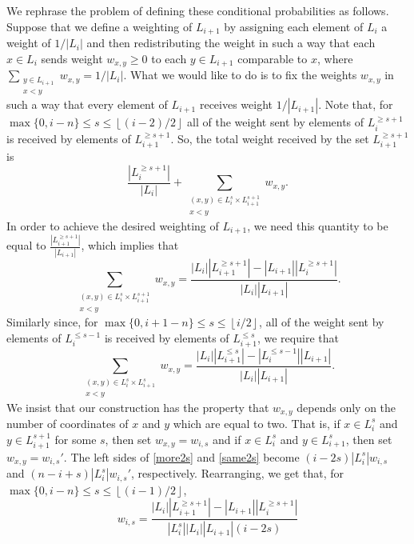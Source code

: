 \documentclass[11 pt]{article}
\theoremstyle{definition}
\theoremstyle{case}
\numberwithin{equation}{section}
\begin{document}
We rephrase the problem of defining these conditional probabilities as follows. Suppose that we define a weighting of $L_{i+1}$ by assigning each element of $L_i$ a weight of $1/|L_i|$ and then redistributing the weight in such a way that each $x\in L_i$ sends weight $w_{x,y}\geq0$ to each $y\in L_{i+1}$ comparable to $x$, where $\sum_{\substack{y\in L_{i+1}\\ x<y}}w_{x,y}=1/|L_i|$. What we would like to do is to fix the weights $w_{x,y}$ in such a way that every element of $L_{i+1}$ receives weight $1/|L_{i+1}|$. Note that, for $\max\{0,i-n\}\leq s\leq \left\lfloor (i-2)/2\right\rfloor$ all of the weight sent by elements of $L_i^{\geq s+1}$ is received by elements of $L_{i+1}^{\geq s+1}$. So, the total weight received by the set $L_{i+1}^{\geq s+1}$ is 
\[\frac{\left|L_i^{\geq s+1}\right|}{|L_i|} + \sum_{\substack{(x,y)\in L_i^{s}\times L_{i+1}^{s+1}\\ x<y}}w_{x,y}.\]
In order to achieve the desired weighting of $L_{i+1}$, we need this quantity to be equal to $\frac{\left|L_{i+1}^{\geq s+1}\right|}{|L_{i+1}|}$, which implies that
\begin{equation}\label{more2s}\sum_{\substack{(x,y)\in L_i^{s}\times L_{i+1}^{s+1}\\ x<y}}w_{x,y} = \frac{\left|L_i\right|\left|L_{i+1}^{\geq s+1}\right|-\left|L_{i+1}\right|\left|L_i^{\geq s+1}\right|}{\left|L_i\right|\left|L_{i+1}\right|}.\end{equation}
Similarly since, for $\max\{0,i+1-n\}\leq s\leq \left\lfloor i/2\right\rfloor$, all of the weight sent by elements of $L_i^{\leq s-1}$ is received by elements of $L_{i+1}^{\leq s}$, we require that
\begin{equation}\label{same2s}\sum_{\substack{(x,y)\in L_i^{s}\times L_{i+1}^{s}\\ x<y}}w_{x,y} = \frac{|L_i|\left|L_{i+1}^{\leq s}\right|-\left|L_i^{\leq s-1}\right||L_{i+1}|}{|L_i||L_{i+1}|}.\end{equation}
We insist that our construction has the property that $w_{x,y}$ depends only on the number of coordinates of $x$ and $y$ which are equal to two. That is, if $x\in L_i^s$ and $y\in L_{i+1}^{s+1}$ for some $s$, then set $w_{x,y}=w_{i,s}$ and if $x\in L_i^s$ and $y\in L_{i+1}^s$, then set $w_{x,y}=w_{i,s}'$. The left sides of  \eqref{more2s} and \eqref{same2s} become $(i-2s)|L_i^s|w_{i,s}$ and $(n-i+s)|L_i^s|w_{i,s}'$, respectively. Rearranging, we get that, for  $\max\{0,i-n\}\leq s\leq \left\lfloor (i-1)/2\right\rfloor$, 
\begin{equation}\label{wExpression}w_{i,s}=\frac{\left|L_i\right|\left|L_{i+1}^{\geq s+1}\right| - \left|L_{i+1}\right|\left|L_i^{\geq s+1}\right|}{\left|L_i^s\right|\left|L_i\right|\left|L_{i+1}\right|(i-2s)}\end{equation}
\end{document}
